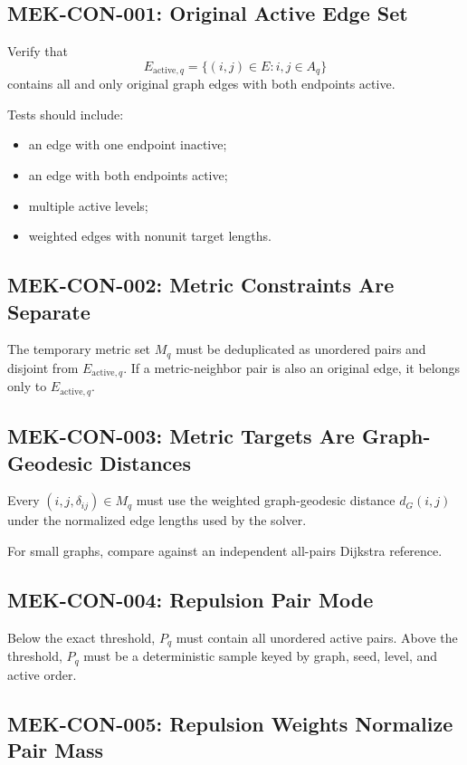 \documentclass[11pt]{article}
\begin{document}
\subsection{MEK-CON-001: Original Active Edge Set}

Verify that
\[
  E_{\mathrm{active},q}
  =
  \{(i,j)\in E : i,j\in A_q\}
\]
contains all and only original graph edges with both endpoints active.

Tests should include:
\begin{itemize}[leftmargin=2em]
  \item an edge with one endpoint inactive;
  \item an edge with both endpoints active;
  \item multiple active levels;
  \item weighted edges with nonunit target lengths.
\end{itemize}

\subsection{MEK-CON-002: Metric Constraints Are Separate}

The temporary metric set \(M_q\) must be deduplicated as unordered pairs and
disjoint from \(E_{\mathrm{active},q}\). If a metric-neighbor pair is also an
original edge, it belongs only to \(E_{\mathrm{active},q}\).

\subsection{MEK-CON-003: Metric Targets Are Graph-Geodesic Distances}

Every \((i,j,\delta_{ij})\in M_q\) must use the weighted graph-geodesic distance
\(d_G(i,j)\) under the normalized edge lengths used by the solver.

For small graphs, compare against an independent all-pairs Dijkstra reference.

\subsection{MEK-CON-004: Repulsion Pair Mode}

Below the exact threshold, \(P_q\) must contain all unordered active pairs.
Above the threshold, \(P_q\) must be a deterministic sample keyed by graph,
seed, level, and active order.

\subsection{MEK-CON-005: Repulsion Weights Normalize Pair Mass}
\end{document}
